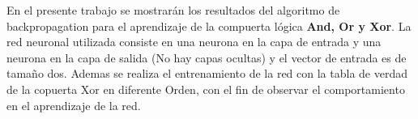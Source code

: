 En el presente trabajo se mostrarán los resultados del algoritmo de backpropagation para el aprendizaje
de la compuerta lógica \textbf{And, Or y Xor}. La red neuronal utilizada consiste en una neurona en la capa de entrada
y una neurona en la capa de salida (No hay capas ocultas) y el vector de entrada es de tamaño dos. Ademas
se realiza el entrenamiento de la red con la tabla de verdad de la copuerta Xor en diferente Orden, con el
fin de observar el comportamiento en el aprendizaje de la red.